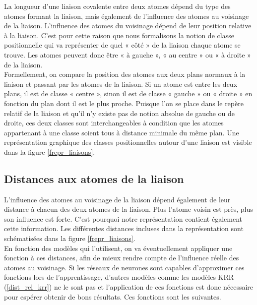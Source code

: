 \par La longueur d'une liaison covalente entre deux atomes dépend du type des atomes formant la liaison, mais également de l'influence des atomes au voisinage de la liaison. L'influence des atomes du voisinage dépend de leur position relative à la liaison. C'est pour cette raison que nous formalisons la notion de classe positionnelle qui va représenter de quel « côté » de la liaison chaque atome se trouve. Les atomes peuvent donc être « à gauche », « au centre » ou « à droite » de la liaison.\\
Formellement, on compare la position des atomes aux deux plans normaux à la liaison et passant par les atomes de la liaison. Si un atome est entre les deux plans, il est de classe « centre », sinon il est de classe « gauche » ou « droite » en fonction du plan dont il est le plus proche. Puisque l'on se place dans le repère relatif de la liaison et qu'il n'y existe pas de notion absolue de gauche ou de droite, ces deux classes sont interchangeables à condition que les atomes appartenant à une classe soient tous à distance minimale du même plan.
Une représentation graphique des classes positionnelles autour d'une liaison est visible dans la figure \ref{frepr_liaisons}.

\subsection{Distances aux atomes de la liaison}
\label{repr_locale_liaisons_cov_distances}

\par L'influence des atomes au voisinage de la liaison dépend également de leur distance à chacun des deux atomes de la liaison. Plus l'atome voisin est près, plus son influence est forte. C'est pourquoi notre représentation contient également cette information. Les différentes distances incluses dans la représentation sont schématisées dans la figure \ref{frepr_liaisons}.\\
En fonction des modèles qui l'utilisent, on va éventuellement appliquer une fonction à ces distances, afin de mieux rendre compte de l'influence réelle des atomes au voisinage. Si les réseaux de neurones sont capables d'approximer ces fonctions lors de l'apprentissage, d'autres modèles comme les modèles KRR (\ref{dist_rel_krr}) ne le sont pas et l'application de ces fonctions est donc nécessaire pour espérer obtenir de bons résultats. Ces fonctions sont les suivantes.\\

